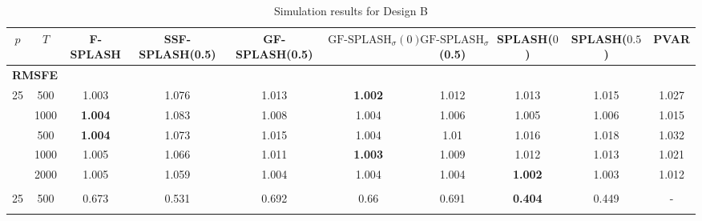 \begin{landscape}
    \bgroup
    \def\arraystretch{1.3}
    \begin{table}[p]
    \footnotesize
    \centering
    \caption{Simulation results for Design B}
    \label{tab:results_designB}
    \begin{tabular}{cccccccccc}    
    \hline \hline
    $p$  &  $T$   &  F-SPLASH  &  SSF-SPLASH(0.5)  &  GF-SPLASH(0.5)  &  $\text{GF-SPLASH}_\sigma(0)$  &  $\text{GF-SPLASH}_\sigma$(0.5)  &  SPLASH($0$)  &  SPLASH($0.5$)  &  PVAR  \\
    \hline
    \multicolumn{10}{l}{\textbf{RMSFE}} \\
	\hline
	 25  & 500  & 1.003                 &                 1.076                 &                      1.013                       & \textbf{1.002}                                 &                      1.012                       & 1.013                    &           1.015            &       1.027       \\ \hdashline
	 25  & 1000 & \textbf{1.004}        &                 1.083                 &                      1.008                       & 1.004                                          &                      1.006                       & 1.005                    &           1.006            &       1.015       \\ \hdashline
	 36  & 500  & \textbf{1.004}        &                 1.073                 &                      1.015                       & 1.004                                          &                       1.01                       & 1.016                    &           1.018            &       1.032       \\ \hdashline
	 36  & 1000 & 1.005                 &                 1.066                 &                      1.011                       & \textbf{1.003}                                 &                      1.009                       & 1.012                    &           1.013            &       1.021       \\ \hdashline
	 36  & 2000 & 1.005                 &                 1.059                 &                      1.004                       & 1.004                                          &                      1.004                       & \textbf{1.002}           &           1.003            &       1.012       \\ \hdashline
	\hline
	\multicolumn{10}{l}{$\mathbf{EE_A}$} \\
	\hline
	 25  & 500  &         0.673         &                 0.531                 &                      0.692                       &                      0.66                      &                      0.691                       & \textbf{0.404}           &           0.449            & -                 \\ \hdashline

\end{tabular}
\end{table}
\end{landscape}
